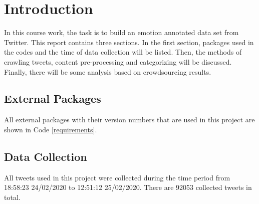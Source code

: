 \section{Introduction}

\renewcommand{\lstlistingname}{Code}

In this course work, the task is to build an emotion	annotated data set from Twitter. This report contains three sections. In the first section, packages used in the codes and the time of data collection will be listed. Then, the methods of crawling tweets, content pre-processing and categorizing will be discussed. Finally, there will be some analysis based on crowdsourcing results.

\subsection{External Packages}



All external packages with their version numbers that are used in this project are shown in Code \ref{requirements}.

\subsection{Data Collection}

All tweets used in this project were collected during the time period from 18:58:23 24/02/2020 to 12:51:12 25/02/2020. There are 92053 collected tweets in total.

